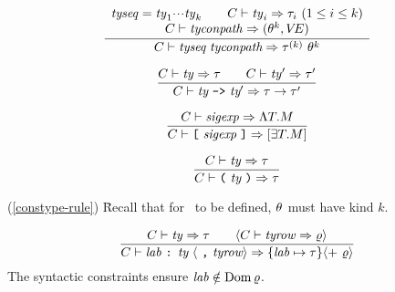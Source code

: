 
\begin{equation}	%
\label{constype-rule}
\frac{\begin{array}{c}
      \tyseq=\ty_1\cdots\ty_k\qquad\C\ts\ty_i\ra\tau_i\ (1\leq i\leq k)\\
      \C\ts\tyconpath\ra(\typefnc[\k],\VE)
      \end{array}
     }
     {\C\ts\constype\ra\apptype{\tauk}{\typefnc[\k]}}
\end{equation}

\begin{equation}	%
\frac{\C\ts\ty\ra\tau\qquad\C\ts\ty'\ra\tau'}
     {\C\ts\funtype\ra\tau\to\tau'}
\end{equation}

\begin{equation}	%
\label{packtype-rule}
\frac{\C\ts\sigexp\ra\sig{\T}{\M}}
     {\C\ts\packtype\ra\packagetype{\exmod{\T}{\M}}}
\end{equation}

\begin{equation}	%
\frac{\C\ts\ty\ra\tau}
     {\C\ts\partype\ra\tau}
\end{equation}



\comments
\begin{tabbing}
(\ref{constype-rule}) \= Recall that for
\apptype{\tauk}{\typefnc}\ to be defined, $\theta^{}$
must have kind $k$.
\end{tabbing}

\begin{equation}	%
\frac{\C\ts\ty\ra\tau\qquad\langle\C\ts\labtys\ra\varrho\rangle}
     {\C\ts\longlabtys\ra\{\lab\mapsto\tau\}\langle +\ \varrho\rangle}\index{32.15}
\end{equation}
\comment The syntactic constraints ensure ${\it lab}\notin\mathop{\rm Dom}\nolimits\varrho$.

